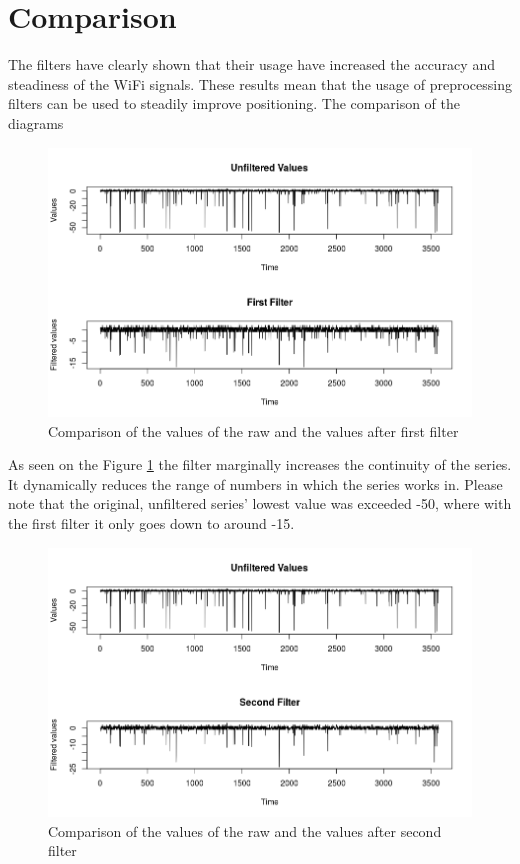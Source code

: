 \section{Comparison}
The filters have clearly shown that their usage have increased the accuracy and steadiness of the WiFi signals. These results mean that the usage of preprocessing filters can be used to steadily improve positioning.
The comparison of the diagrams
\begin{figure}[h!]
	\centering
		\includegraphics[width=.9\linewidth]{figures/comp1.png}
		\caption{Comparison of the values of the raw and the values after first filter
		}\label{fig:firstComp}
\end{figure}


As seen on the Figure \ref{fig:firstComp} the filter marginally increases the continuity of the series.
It dynamically reduces the range of numbers in which the series works in. Please note that the original, unfiltered series' lowest value was exceeded -50, where with the first filter it only goes down to around -15.


\begin{figure}[h!]
	\centering
		\includegraphics[width=.9\linewidth]{figures/comp2.png}
		\caption{Comparison of the values of the raw and the values after second filter }\label{fig:secondComp}
\end{figure}

